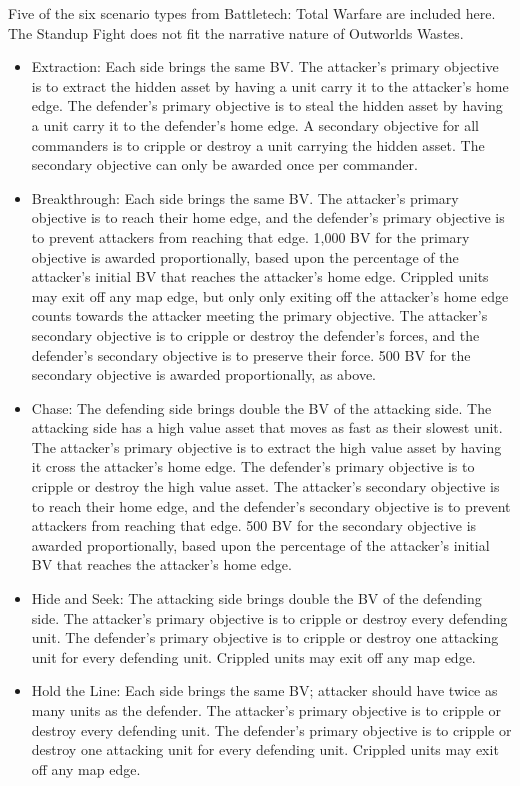 \documentclass[UTF8]{article}
\begin{document}
Five of the six scenario types from Battletech: Total Warfare are included here.
The Standup Fight does not fit the narrative nature of Outworlds Wastes.

\begin{itemize}

\item Extraction: Each side brings the same BV.
The attacker's primary objective is to extract the hidden asset by having a unit carry it to the attacker's home edge.
The defender's primary objective is to steal the hidden asset by having a unit carry it to the defender's home edge.
A secondary objective for all commanders is to cripple or destroy a unit carrying the hidden asset.
The secondary objective can only be awarded once per commander.

\item Breakthrough: Each side brings the same BV.
The attacker's primary objective is to reach their home edge, and the defender's primary objective is to prevent attackers from reaching that edge.
1,000 BV for the primary objective is awarded proportionally, based upon the percentage of the attacker's initial BV that reaches the attacker's home edge.
Crippled units may exit off any map edge, but only only exiting off the attacker's home edge counts towards the attacker meeting the primary objective.
The attacker's secondary objective is to cripple or destroy the defender's forces, and the defender's secondary objective is to preserve their force.
500 BV for the secondary objective is awarded proportionally, as above. 

\item Chase: The defending side brings double the BV of the attacking side.
The attacking side has a high value asset that moves as fast as their slowest unit.
The attacker's primary objective is to extract the high value asset by having it cross the attacker's home edge.
The defender's primary objective is to cripple or destroy the high value asset.
The attacker's secondary objective is to reach their home edge, and the defender's secondary objective is to prevent attackers from reaching that edge.
500 BV for the secondary objective is awarded proportionally, based upon the percentage of the attacker's initial BV that reaches the attacker's home edge.

\item Hide and Seek: The attacking side brings double the BV of the defending side.
The attacker's primary objective is to cripple or destroy every defending unit.
The defender's primary objective is to cripple or destroy one attacking unit for every defending unit.
Crippled units may exit off any map edge.

\item Hold the Line: Each side brings the same BV; attacker should have twice as many units as the defender.
The attacker's primary objective is to cripple or destroy every defending unit.
The defender's primary objective is to cripple or destroy one attacking unit for every defending unit.
Crippled units may exit off any map edge.

\end{itemize}
\end{document}
